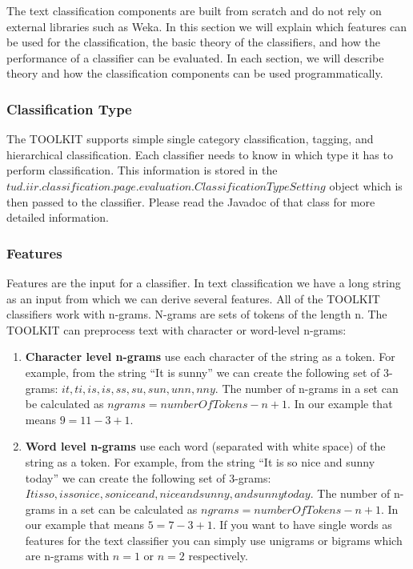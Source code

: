 \documentclass[a4paper,twoside]{book}      %
\begin{document}
The text classification components are built from scratch and do not rely on external libraries such as Weka. In this section we will explain which features can be used for the classification, the basic theory of the classifiers, and how the performance of a classifier can be evaluated. In each section, we will describe theory and how the classification components can be used programmatically.

\subsubsection{Classification Type}
The TOOLKIT supports simple single category classification, tagging, and hierarchical classification. Each classifier needs to know in which type it has to perform classification.
This information is stored in the $tud.iir.classification.page.evaluation.ClassificationTypeSetting$ object which is then passed to the classifier. Please read the Javadoc of that class for more detailed information.

\subsubsection{Features}
Features are the input for a classifier. In text classification we have a long string as an input from which we can derive several features. All of the TOOLKIT classifiers work with n-grams. N-grams are sets of tokens of the length n. The TOOLKIT can preprocess text with character or word-level n-grams:

\begin{enumerate}
\item \textbf{Character level n-grams} use each character of the string as a token. For example, from the string ``It is sunny'' we can create the following set of 3-grams: ${it ,t i, is,is ,s s, su,sun,unn,nny}$. The number of n-grams in a set can be calculated as $ngrams = numberOfTokens - n + 1$. In our example that means $9 = 11 - 3 + 1$.
\item \textbf{Word level n-grams} use each word (separated with white space) of the string as a token. For example, from the string ``It is so nice and sunny today'' we can create the following set of 3-grams: ${It is so,is so nice,so nice and,nice and sunny,and sunny today}$. The number of n-grams in a set can be calculated as $ngrams = numberOfTokens - n + 1$. In our example that means $5 = 7 - 3 + 1$. If you want to have single words as features for the text classifier you can simply use unigrams or bigrams which are n-grams with $n=1$ or $n=2$ respectively.
\end{enumerate}
\end{document}
